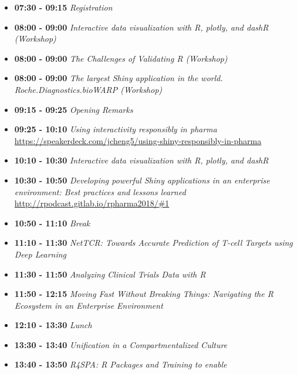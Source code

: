 \documentclass[]{book}
\providecommand{\tightlist}{%
  \setlength{\itemsep}{0pt}\setlength{\parskip}{0pt}}
\theoremstyle{definition}
\theoremstyle{definition}
\theoremstyle{definition}
\theoremstyle{remark}
\begin{document}
\begin{itemize}
\tightlist
\item
  \textbf{07:30 - 09:15} \emph{Registration}\\
\item
  \textbf{08:00 - 09:00} \emph{Interactive data visualization with R,
  plotly, and dashR (Workshop)}\\
\item
  \textbf{08:00 - 09:00} \emph{The Challenges of Validating R
  (Workshop)}\\
\item
  \textbf{08:00 - 09:00} \emph{The largest Shiny application in the
  world. Roche.Diagnostics.bioWARP (Workshop)}\\
\item
  \textbf{09:15 - 09:25} \emph{Opening Remarks}\\
\item
  \textbf{09:25 - 10:10} \emph{Using interactivity responsibly in
  pharma}
  \url{https://speakerdeck.com/jcheng5/using-shiny-responsibly-in-pharma}
\item
  \textbf{10:10 - 10:30} \emph{Interactive data visualization with R,
  plotly, and dashR}\\
\item
  \textbf{10:30 - 10:50} \emph{Developing powerful Shiny applications in
  an enterprise environment: Best practices and lessons learned}
  \url{http://rpodcast.gitlab.io/rpharma2018/\#1}
\item
  \textbf{10:50 - 11:10} \emph{Break}\\
\item
  \textbf{11:10 - 11:30} \emph{NetTCR: Towards Accurate Prediction of
  T-cell Targets using Deep Learning}\\
\item
  \textbf{11:30 - 11:50} \emph{Analyzing Clinical Trials Data with R}\\
\item
  \textbf{11:50 - 12:15} \emph{Moving Fast Without Breaking Things:
  Navigating the R Ecosystem in an Enterprise Environment}\\
\item
  \textbf{12:10 - 13:30} \emph{Lunch}\\
\item
  \textbf{13:30 - 13:40} \emph{Unification in a Compartmentalized
  Culture}\\
\item
  \textbf{13:40 - 13:50} \emph{R4SPA: R Packages and Training to enable
}
\end{itemize}
\end{document}
